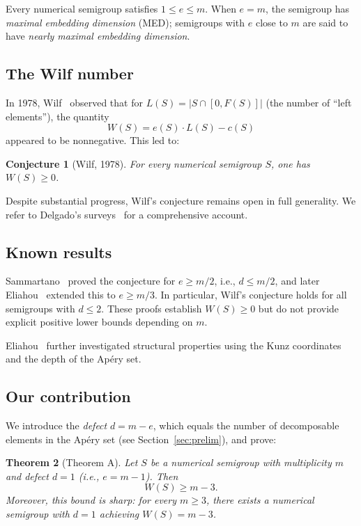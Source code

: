 \documentclass[11pt]{amsart}
\newtheorem{theorem}{Theorem}[section]
\newtheorem{conjecture}[theorem]{Conjecture}
\theoremstyle{definition}
\theoremstyle{remark}
\begin{document}
Every numerical semigroup satisfies $1 \le e \le m$.
When $e = m$, the semigroup has \emph{maximal embedding dimension} (MED);
semigroups with $e$ close to $m$ are said to have \emph{nearly maximal embedding dimension}.

\subsection{The Wilf number}
In 1978, Wilf~\cite{Wilf1978} observed that for
$L(S) = |S \cap [0, F(S)]|$ (the number of ``left elements''), the quantity
\begin{equation}\label{eq:wilf-number}
  W(S) = e(S) \cdot L(S) - c(S)
\end{equation}
appeared to be nonneg\-ative.  This led to:

\begin{conjecture}[Wilf, 1978]\label{conj:wilf}
For every numerical semigroup $S$, one has $W(S) \ge 0$.
\end{conjecture}

Despite substantial progress,
Wilf's conjecture remains open in full generality.
We refer to Delgado's surveys~\cite{Delgado2019, Delgado2020}
for a comprehensive account.

\subsection{Known results}

Sammartano~\cite{Sammartano2012} proved the conjecture for $e \ge m/2$,
i.e., $d \le m/2$, and later
Eliahou~\cite{Eliahou2018, Eliahou2020} extended this to $e \ge m/3$.
In particular, Wilf's conjecture holds for all semigroups with $d \le 2$.
These proofs establish $W(S) \ge 0$ but do not provide explicit positive lower bounds
depending on $m$.

Eliahou~\cite{Eliahou2024} further investigated structural properties
using the Kunz coordinates and the depth of the Ap\'ery set.

\subsection{Our contribution}

We introduce the \emph{defect} $d = m - e$, which equals the number of
decomposable elements in the Ap\'ery set (see Section~\ref{sec:prelim}),
and prove:

\begin{theorem}[Theorem A]\label{thm:A-intro}
Let $S$ be a numerical semigroup with multiplicity $m$ and defect $d = 1$
(i.e., $e = m - 1$).  Then
\[
  W(S) \ge m - 3.
\]
Moreover, this bound is sharp: for every $m \ge 3$, there exists a
numerical semigroup with $d = 1$ achieving $W(S) = m - 3$.
\end{theorem}
\end{document}

